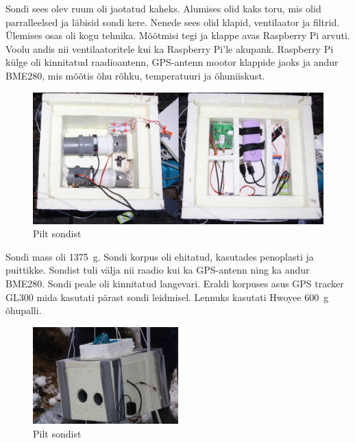 \documentclass{trkut}%
\begin{document}
Sondi sees olev ruum oli jaotatud kaheks. Alumises olid kaks toru, mis olid parralleelsed ja läbisid sondi kere. Nenede sees olid klapid, ventilaator ja filtrid. Ülemises osas oli kogu tehnika. Mõõtmisi tegi ja klappe avas Raspberry Pi arvuti. Voolu andis nii ventilaatoritele kui ka Raspberry Pi'le akupank. Raspberry Pi külge oli kinnitatud raadioantenn, GPS-antenn mootor klappide jaoks ja andur BME280, mis mõõtis õhu rõhku, temperatuuri ja õhuniiskust.
\begin{figure}[h]
	\includegraphics[width=1\textwidth]{PicGra/sond2korrus.jpg}
	\caption{Pilt sondist}
	\label{sond1}
\end{figure}

Sondi mass oli \SI{1375}{g}. Sondi korpus oli ehitatud, kasutades penoplasti ja puittikke. Sondist tuli välja nii raadio kui ka GPS-antenn ning ka andur BME280. Sondi peale oli kinnitatud langevari. Eraldi korpuses asus GPS tracker GL300 mida kasutati pärast sondi leidmisel. Lennuks kasutati Hwoyee \SI{600}{g} õhupalli.
\begin{figure}[h]
	\includegraphics[width=0.5\textwidth]{PicGra/sond.jpg}
	\caption{Pilt sondist}
	\label{sond2}
\end{figure}
\end{document}
